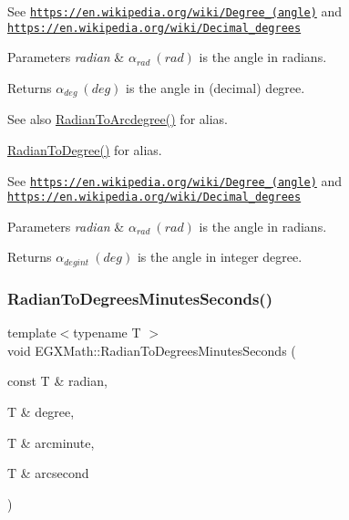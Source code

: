 See \href{https://en.wikipedia.org/wiki/Degree_(angle)}{\tt https\+://en.\+wikipedia.\+org/wiki/\+Degree\+\_\+(angle)} and \href{https://en.wikipedia.org/wiki/Decimal_degrees}{\tt https\+://en.\+wikipedia.\+org/wiki/\+Decimal\+\_\+degrees} 
\begin{DoxyParams}{Parameters}
{\em radian} & $\alpha_{rad}\ (rad)$ is the angle in radians. \\
\hline
\end{DoxyParams}
\begin{DoxyReturn}{Returns}
$\alpha_{deg}\ (deg)$ is the angle in (decimal) degree. 
\end{DoxyReturn}
\begin{DoxySeeAlso}{See also}
\mbox{\hyperlink{group___e_g_x_math-_angle_conversions-_radian_ga3dfdc97357cc07f8379976bbc08f9852}{Radian\+To\+Arcdegree()}} for alias. 

\mbox{\hyperlink{group___e_g_x_math-_angle_conversions-_radian_ga25bbce6cdc1c3621f2a158d320e3bc45}{Radian\+To\+Degree()}} for alias.
\end{DoxySeeAlso}
See \href{https://en.wikipedia.org/wiki/Degree_(angle)}{\tt https\+://en.\+wikipedia.\+org/wiki/\+Degree\+\_\+(angle)} and \href{https://en.wikipedia.org/wiki/Decimal_degrees}{\tt https\+://en.\+wikipedia.\+org/wiki/\+Decimal\+\_\+degrees} 
\begin{DoxyParams}{Parameters}
{\em radian} & $\alpha_{rad}\ (rad)$ is the angle in radians. \\
\hline
\end{DoxyParams}
\begin{DoxyReturn}{Returns}
$\alpha_{deg int}\ (deg)$ is the angle in integer degree. 
\end{DoxyReturn}
\mbox{\label{group___e_g_x_math-_angle_conversions-_radian_ga1de6f151aa0950edd2b62ec2449c9361}} 
\subsubsection{\texorpdfstring{Radian\+To\+Degrees\+Minutes\+Seconds()}{RadianToDegreesMinutesSeconds()}}
{\footnotesize\ttfamily template$<$typename T $>$ \\
void E\+G\+X\+Math\+::\+Radian\+To\+Degrees\+Minutes\+Seconds (\begin{DoxyParamCaption}\item[{const T \&}]{radian,  }\item[{T \&}]{degree,  }\item[{T \&}]{arcminute,  }\item[{T \&}]{arcsecond }\end{DoxyParamCaption})}



